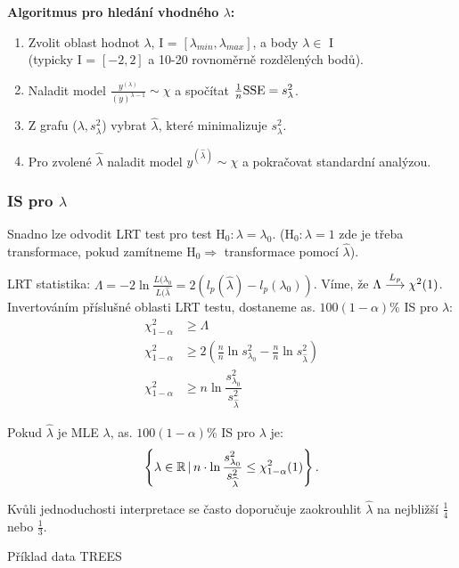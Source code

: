 \textbf{Algoritmus pro hledání vhodného $\lambda$:}
\begin{enumerate}
\item Zvolit oblast hodnot $ \lambda $, I = $ [ \lambda_{min}, \lambda_{max} ] $, a body $ \lambda \in $ I \\
(typicky I = $[-2,2]$ a 10-20 rovnoměrně rozdělených bodů).

\item Naladit model $ \frac{y^{(\lambda)}}{( \dot{y})^{\lambda-1}} \sim \chi $ a spočítat $ \frac{1}{n}\mathrm{SSE} = s_{\lambda}^{2} $.

\item Z grafu ($ \lambda , s_{\lambda}^{2} $) vybrat $ \widehat{\lambda} $, které minimalizuje $ s_{\lambda}^{2} $.

\item Pro zvolené $ \widehat{\lambda} $ naladit model $ y^{(\widehat{\lambda})} \sim \chi $ a pokračovat standardní analýzou.
\end{enumerate}
\subsubsection*{IS pro $ \lambda $}
Snadno lze odvodit LRT test pro test $ \text{H}_0 : \lambda = \lambda_0 $. ($ \text{H}_0 : \lambda = 1 $ zde je třeba transformace, pokud zamítneme $ \text{H}_0 \Rightarrow $ transformace pomocí $ \widehat{\lambda} $).

LRT statistika: $ \Lambda = -2 \ln \frac{L(\lambda_0}{L(\widehat{\lambda}} = 2 ( l_p(\widehat{\lambda}) - l_p(\lambda_0)) $. Víme, že $ \Lambda \stackrel{L_p}{\longrightarrow} \chi^2(1)  $. Invertováním příslušné oblasti LRT testu, dostaneme as. $ 100(1-\alpha)\% $ IS pro $ \lambda $:
\begin{align*}
 \chi^2_{1-\alpha} & \geq \Lambda \\
\chi^2_{1-\alpha} & \geq 2( \frac{n}{n}\ln s^2_{\lambda_0} - \frac{n}{n}\ln s^2_{\widehat{\lambda}}  ) \\
\chi^2_{1-\alpha} & \geq n \ln\dfrac{s^2_{\lambda_0}}{s^2_{\widehat{\lambda}}}
\end{align*}

Pokud $ \widehat{\lambda} $ je MLE $ \lambda $, as. $ 100(1-\alpha)\% $ IS  pro $ \lambda $ je:
$$
 \left\{ \lambda \in \mathbb{R} \, \vert \, n \cdot \ln\dfrac{s^2_{\lambda_0}}{s^2_{\widehat{\lambda}}} \leq \chi^2_{1-\alpha}(1) \right\}.
$$
\begin{remark}
 Kvůli jednoduchosti interpretace se často doporučuje zaokrouhlit $ \widehat{\lambda} $ na nejbližší $ \frac{1}{4} $ nebo $ \frac{1}{3} $.
\end{remark}
Příklad data TREES

